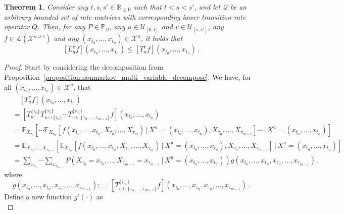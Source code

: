 \documentclass[a4paper,reqno]{amsart}
\newtheorem{theorem}{Theorem}
\newcommand{\reals}{\mathbb{R}}
\newcommand{\realsnonneg}{\reals_{\geq 0}}
\newcommand{\states}{\mathcal{X}}
\newcommand{\gambles}{\mathcal{L}}
\newcommand{\lrate}{\underline{Q}}
\newcommand{\coloneqq}{:\!=}
\begin{document}
\begin{theorem}\label{theorem:nonmarkov_multi_variable_lower_bounded}
Consider any $t,s,s'\in\realsnonneg$ such that $t<s<s'$, and let $\mathcal{Q}$ be an arbitrary bounded set of rate matrices with corresponding lower transition rate operator $\lrate$. Then, for any $P\in\mathbb{P}_\mathcal{Q}$, any $u\in\mathcal{U}_{[0,t]}$ and $v\in\mathcal{U}_{[s,s']}$, any $f\in\gambles(\states^{u\cup v})$ and any $(x_{t_0},\ldots,x_{t_n})\in\states^u$, it holds that
\begin{equation*}
\left[L_u^v f\right](x_{t_0},\ldots,x_{t_n}) \leq \left[T_u^v f\right](x_{t_0},\ldots,x_{t_n})\,.
\end{equation*}
\end{theorem}
\begin{proof}
Start by considering the decomposition from Proposition~\ref{proposition:nonmarkov_multi_variable_decompose}. We have, for all $(x_{t_0},\ldots,x_{t_n})\in\states^u$, that
\begin{align*}
&\quad \left[T_u^vf\right](x_{t_0},\ldots,x_{t_n}) \\
&= \left[T_u^{\{\tau_0\}}T_{u\cup\{\tau_0\}}^{\{\tau_1\}}\cdots T_{u\cup\{\tau_0,\ldots,\tau_{m-1}\}}^{\{\tau_m\}} f\right](x_{t_0},\ldots,x_{t_n}) \\
&= \mathbb{E}_{X_{\tau_0}}\left[\cdots\mathbb{E}_{X_{\tau_m}}\left[f(x_{t_0},\ldots,x_{t_n},X_{\tau_0},\ldots,X_{\tau_m})\,\vert\,X^u=(x_{t_0},\ldots,x_{t_n}),X_{\tau_0},\ldots,X_{\tau_{m-1}}\right]\cdots\,\vert\,X^u=(x_{t_0},\ldots,x_{t_n})\right] \\
&= \mathbb{E}_{X_{\tau_0},\ldots,X_{\tau_{m-1}}}\left[\mathbb{E}_{X_{\tau_m}}\left[f(x_{t_0},\ldots,x_{t_n},X_{\tau_0},\ldots,X_{\tau_m})\,\vert\,X^u=(x_{t_0},\ldots,x_{t_n}),X_{\tau_0},\ldots,X_{\tau_{m-1}}\right]\,\vert\,X^u=(x_{t_0},\ldots,x_{t_n})\right] \\
&= \sum_{x_{\tau_0}}\cdots\sum_{x_{\tau_{m-1}}} P\left(X_{\tau_0}=x_{\tau_0},\ldots,X_{\tau_{m-1}}=x_{\tau_{m-1}}\,\vert\,X^u=(x_{t_0},\ldots,x_{t_n})\right)g(x_{t_0},\ldots,x_{t_n},x_{\tau_0},\ldots,x_{\tau_{m-1}})\,,
\end{align*}
where
\begin{equation*}
g(x_{t_0},\ldots,x_{t_n},x_{\tau_0},\ldots,x_{\tau_{m-1}}) \coloneqq \left[T_{u\cup\{\tau_0,\ldots,\tau_{m-1}\}}^{\{\tau_m\}}f\right](x_{t_0},\ldots,x_{t_n},x_{\tau_0},\ldots,x_{\tau_{m-1}})\,.
\end{equation*}
Define a new function $g'(\cdot)$ as
\begin{equation*}

\end{equation*}
\end{proof}
\end{document}
